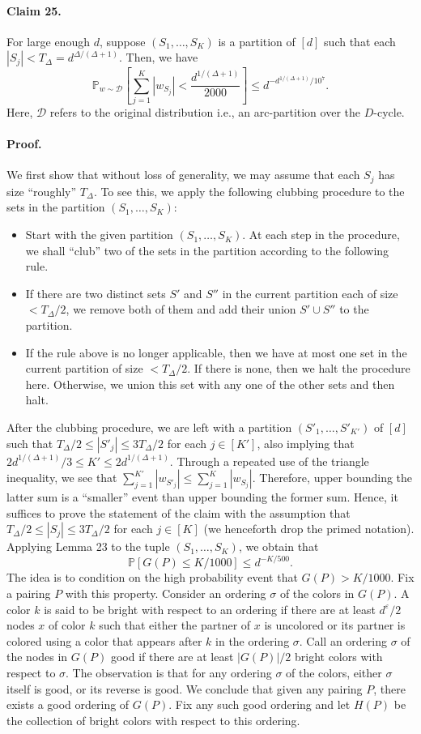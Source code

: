 \paragraph{Claim 25.} For large enough $d$, suppose $(S_1,\ldots,S_K)$ is a partition of $[d]$ such that each $|S_j|<T_\Delta=d^{\Delta/(\Delta+1)}$. Then, we have
\[\mathbb P_{w\sim\mathcal D}\left[\sum_{j=1}^K|w_{S_j}|<\frac{d^{1/(\Delta+1)}}{2000}\right]\leq d^{-d^{1/(\Delta+1)}/10^7}.\]
Here, $\mathcal D$ refers to the original distribution i.e., an arc-partition over the $D$-cycle.
\paragraph{Proof.} We first show that without loss of generality, we may assume that each $S_j$ has size ``roughly'' $T_\Delta$. To see this, we apply the following clubbing procedure to the sets in the partition $(S_1,\ldots,S_K)$:
\begin{itemize}
\item Start with the given partition $(S_1,\ldots,S_K)$. At each step in the procedure, we shall ``club'' two of the sets in the partition according to the following rule.
\item If there are two distinct sets $S'$ and $S''$ in the current partition each of size $<T_\Delta/2$, we remove both of them and add their union $S'\cup S''$ to the partition.
\item If the rule above is no longer applicable, then we have at most one set in the current partition of size $<T_\Delta/2$. If there is none, then we halt the procedure here. Otherwise, we union this set with any one of the other sets and then halt.
\end{itemize}
After the clubbing procedure, we are left with a partition $(S'_1,\ldots,S'_{K'})$ of $[d]$ such that $T_\Delta/2\leq|S'_j|\leq3T_\Delta/2$ for each $j\in[K']$, also implying that $2d^{1/(\Delta+1)}/3\leq K'\leq2d^{1/(\Delta+1)}$. Through a repeated use of the triangle inequality, we see that $\sum_{j=1}^{K'}|w_{S'_j}|\leq\sum_{j=1}^K|w_{S_j}|$. Therefore, upper bounding the latter sum is a ``smaller'' event than upper bounding the former sum. Hence, it suffices to prove the statement of the claim with the assumption that $T_\Delta/2\leq|S_j|\leq3T_\Delta/2$ for each $j\in[K]$ (we henceforth drop the primed notation).
Applying Lemma 23 to the tuple $(S_1,\ldots,S_K)$, we obtain that
\[\mathbb P[G(P)\leq K/1000]\leq d^{-K/500}.\]
The idea is to condition on the high probability event that $G(P)>K/1000$. Fix a pairing $P$ with this property. Consider an ordering $\sigma$ of the colors in $G(P)$. A color $k$ is said to be bright with respect to an ordering if there are at least $d^\varepsilon/2$ nodes $x$ of color $k$ such that either the partner of $x$ is uncolored or its partner is colored using a color that appears after $k$ in the ordering $\sigma$. Call an ordering $\sigma$ of the nodes in $G(P)$ good if there are at least $|G(P)|/2$ bright colors with respect to $\sigma$. The observation is that for any ordering $\sigma$ of the colors, either $\sigma$ itself is good, or its reverse is good. We conclude that given any pairing $P$, there exists a good ordering of $G(P)$. Fix any such good ordering and let $H(P)$ be the collection of bright colors with respect to this ordering.
